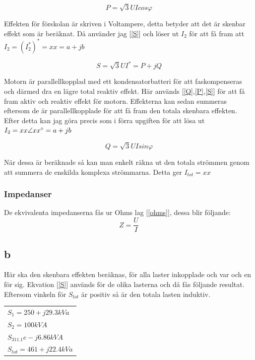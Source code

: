 \documentclass{article}
\begin{document}
  \begin{equation}
    P=\sqrt3UIcos\varphi
    \label{P}
  \end{equation}

  Effekten för förskolan är skriven i Voltampere, detta betyder att det är skenbar effekt som är beräknat.
  Då använder jag [\ref{S}] och löser ut $I_2$ för att få fram att $I_2=(I_2^*)^*=xx=a+jb$

  \begin{equation}
    S=\sqrt3UI^*=P+jQ
    \label{S}
  \end{equation}

  Motorn är parallellkopplad med ett kondensatorbatteri för att faskompenseras och därmed dra en lägre total reaktiv effekt.
  Här används [\ref{Q},\ref{P},\ref{S}] för att få fram aktiv och reaktiv effekt för motorn.
  Effekterna kan sedan summeras eftersom de är parallellkopplade för att få fram den totala skenbara effekten.
  Efter detta kan jag göra precis som i förra upgiften för att lösa ut $I_2=xx\angle{xx\degree}=a+jb$

  \begin{equation}
    Q=\sqrt3UIsin\varphi
    \label{Q}
  \end{equation}

  När dessa är beräknade så kan man enkelt räkna ut den totala strömmen genom att summera de enskilda komplexa strömmarna.
  Detta ger $I_{tot}=xx$

  \subsubsection{Impedanser}
  De ekvivalenta impedanserna fås ur Ohms lag [\ref{ohms}], dessa blir följande:
  \begin{equation}
    Z=\frac{U}{I}
    \label{ohms}
  \end{equation}


\subsection{b}
  Här ska den skenbara effekten beräknas, för alla laster inkopplade och var och en för sig.
  Ekvation [\ref{S}] används för de olika lasterna och då fås följande resultat.
  Eftersom vinkeln för $S_{tot}$ är positiv så är den totala lasten induktiv.

  \begin{tabular}{l}
      $S_1=250 + j29.3 kVa$ \\
      $S_2=100kVA$ \\
      $S_311.1e - j6.86 kVA$\\
      $S_{tot}=461 + j22.4 kVa$
  \end{tabular}
\end{document}
